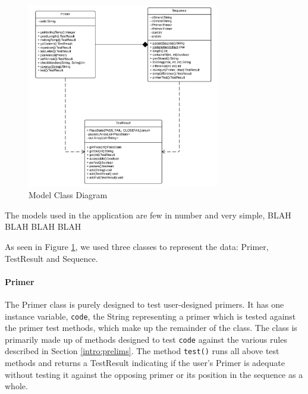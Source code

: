 
\begin{figure}[h]
  \begin{center}
    \includegraphics[width=0.75\textwidth]{./images/currentBuild/modelClassDiagram.png}
    \caption{
      \label{fig:currentBuild:model}
      Model Class Diagram 
    }
  \end{center}
\end{figure}

The models used in the application are few in number and very simple, BLAH BLAH BLAH BLAH

As seen in Figure \ref{fig:currentBuild:model}, we used three classes to represent the data:
Primer, TestResult and Sequence.

\paragraph{Primer}
The Primer class is purely designed to test user-designed primers. It has 
one instance variable, \texttt{code}, the String representing a primer
which is tested against the primer test methods, which make up the 
remainder of the class. The class is primarily made up of methods 
designed to test \texttt{code} against the various rules described in Section 
\ref{intro:prelims}. The method \texttt{test()} runs all above test 
methods and returns a TestResult indicating if the user's Primer 
is adequate without testing it against the opposing primer or its position
in the sequence as a whole.

